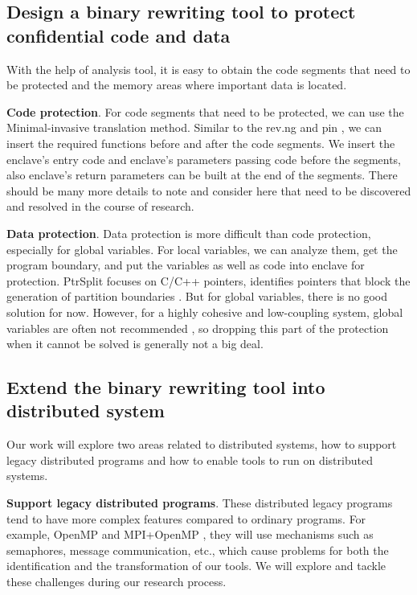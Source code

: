 \subsection{Design a binary rewriting tool to protect confidential code and data}
With the help of analysis tool, it is easy to obtain the code segments that need
to be protected and the memory areas where important data is located.

\textbf{Code protection}. For code segments that need to be protected,
we can use the Minimal-invasive translation method. Similar to the rev.ng \cite{Federico2017revngAU}
and pin \cite{Luk2005PinBC}, we can insert the required functions before and
after the code segments. We insert the enclave's entry code and enclave's parameters passing code
before the segments, also enclave's return parameters can be built at the end of the segments.
There should be many more details to note and consider here that need to be
discovered and resolved in the course of research.

\textbf{Data protection}. Data protection is more difficult than code protection,
especially for global variables.
For local variables, we can analyze them, get the program boundary,
and put the variables as well as code into enclave for protection.
PtrSplit focuses on C/C++ pointers, identifies pointers that block
the generation of partition boundaries \cite{Liu2017PtrSplitSG}.
But for global variables, there is no good solution for now. However,
for a highly cohesive and low-coupling system, global variables are often not recommended
\cite{GlobalVariablesAreBad},
so dropping this part of the protection when it cannot be solved is generally not a big deal. 

\subsection{Extend the binary rewriting tool into distributed system}
Our work will explore two areas related to distributed systems, how to support legacy distributed
programs and how to enable tools to run on distributed systems.

\textbf{Support legacy distributed programs}.
These distributed legacy programs tend to have more complex features
compared to ordinary programs.
For example, OpenMP \cite{Dagum1998OpenMPAI} and MPI+OpenMP \cite{Klinkenberg2020CHAMELEONRL},
they will use mechanisms such as semaphores, message communication, etc., which cause problems
for both the identification and the transformation of our tools.
We will explore and tackle these challenges during our research process.

